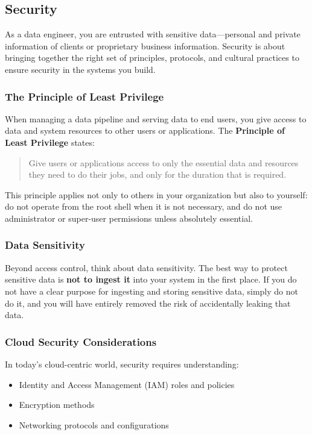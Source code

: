 \documentclass{article}
\begin{document}
\subsection{Security}
As a data engineer, you are entrusted with sensitive data---personal and private information of clients or proprietary business information. Security is about bringing together the right set of principles, protocols, and cultural practices to ensure security in the systems you build.

\subsubsection{The Principle of Least Privilege}
When managing a data pipeline and serving data to end users, you give access to data and system resources to other users or applications. The \textbf{Principle of Least Privilege} states:
\begin{quote}
    Give users or applications access to only the essential data and resources they need to do their jobs, and only for the duration that is required.
\end{quote}
This principle applies not only to others in your organization but also to yourself: do not operate from the root shell when it is not necessary, and do not use administrator or super-user permissions unless absolutely essential.

\subsubsection{Data Sensitivity}
Beyond access control, think about data sensitivity. The best way to protect sensitive data is \textbf{not to ingest it} into your system in the first place. If you do not have a clear purpose for ingesting and storing sensitive data, simply do not do it, and you will have entirely removed the risk of accidentally leaking that data.

\subsubsection{Cloud Security Considerations}
In today's cloud-centric world, security requires understanding:
\begin{itemize}
    \item Identity and Access Management (IAM) roles and policies
    \item Encryption methods
    \item Networking protocols and configurations
\end{itemize}
\end{document}
